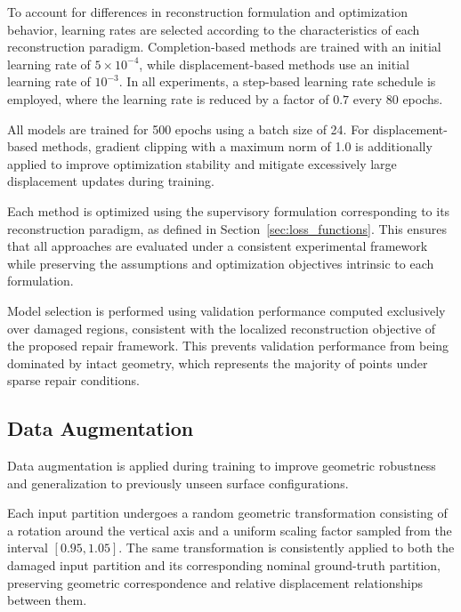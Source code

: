 To account for differences in reconstruction formulation and optimization behavior, learning rates are selected according to the characteristics of each reconstruction paradigm. Completion-based methods are trained with an initial learning rate of $5 \times 10^{-4}$, while displacement-based methods use an initial learning rate of $10^{-3}$. In all experiments, a step-based learning rate schedule is employed, where the learning rate is reduced by a factor of $0.7$ every 80 epochs.

All models are trained for 500 epochs using a batch size of 24. For displacement-based methods, gradient clipping with a maximum norm of 1.0 is additionally applied to improve optimization stability and mitigate excessively large displacement updates during training.

Each method is optimized using the supervisory formulation corresponding to its reconstruction paradigm, as defined in Section~\ref{sec:loss_functions}. This ensures that all approaches are evaluated under a consistent experimental framework while preserving the assumptions and optimization objectives intrinsic to each formulation.

Model selection is performed using validation performance computed exclusively over damaged regions, consistent with the localized reconstruction objective of the proposed repair framework. This prevents validation performance from being dominated by intact geometry, which represents the majority of points under sparse repair conditions.


\subsection{Data Augmentation}
\label{sec:data_augmentation}

Data augmentation is applied during training to improve geometric robustness and generalization to previously unseen surface configurations.

Each input partition undergoes a random geometric transformation consisting of a rotation around the vertical axis and a uniform scaling factor sampled from the interval $[0.95, 1.05]$. The same transformation is consistently applied to both the damaged input partition and its corresponding nominal ground-truth partition, preserving geometric correspondence and relative displacement relationships between them.

